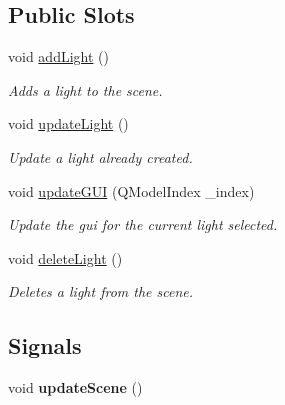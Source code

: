 \subsection*{Public Slots}
\begin{DoxyCompactItemize}
\item 
\hypertarget{class_light_manager_aa25de876fdf8e06b33e6d8e161f8a44e}{void \hyperlink{class_light_manager_aa25de876fdf8e06b33e6d8e161f8a44e}{add\-Light} ()}\label{class_light_manager_aa25de876fdf8e06b33e6d8e161f8a44e}

\begin{DoxyCompactList}\small\item\em Adds a light to the scene. \end{DoxyCompactList}\item 
\hypertarget{class_light_manager_a403f28b82c78e0b9946848f16ecd7581}{void \hyperlink{class_light_manager_a403f28b82c78e0b9946848f16ecd7581}{update\-Light} ()}\label{class_light_manager_a403f28b82c78e0b9946848f16ecd7581}

\begin{DoxyCompactList}\small\item\em Update a light already created. \end{DoxyCompactList}\item 
\hypertarget{class_light_manager_ad50e75aa287fa5c623fef70c820de9b6}{void \hyperlink{class_light_manager_ad50e75aa287fa5c623fef70c820de9b6}{update\-G\-U\-I} (Q\-Model\-Index \-\_\-index)}\label{class_light_manager_ad50e75aa287fa5c623fef70c820de9b6}

\begin{DoxyCompactList}\small\item\em Update the gui for the current light selected. \end{DoxyCompactList}\item 
\hypertarget{class_light_manager_a277063837cd2e2d17fd1e221e39add4a}{void \hyperlink{class_light_manager_a277063837cd2e2d17fd1e221e39add4a}{delete\-Light} ()}\label{class_light_manager_a277063837cd2e2d17fd1e221e39add4a}

\begin{DoxyCompactList}\small\item\em Deletes a light from the scene. \end{DoxyCompactList}\end{DoxyCompactItemize}
\subsection*{Signals}
\begin{DoxyCompactItemize}
\item 
\hypertarget{class_light_manager_a8292d4fd581eb7f72c68976732f5fa3b}{void {\bfseries update\-Scene} ()}\label{class_light_manager_a8292d4fd581eb7f72c68976732f5fa3b}

\end{DoxyCompactItemize}
